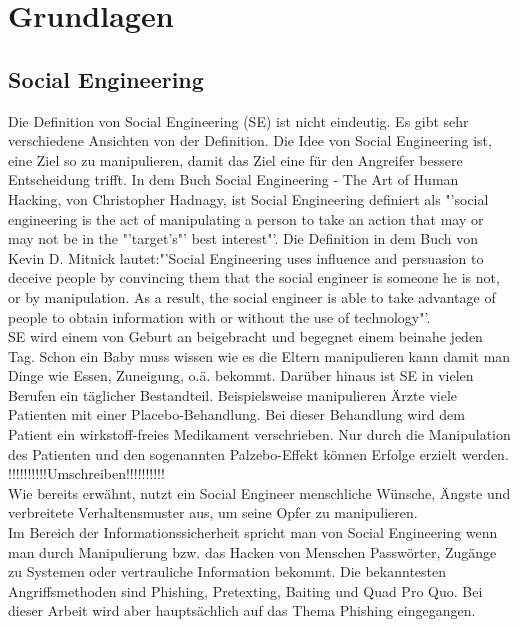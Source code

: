 
\chapter {Grundlagen}  %
\label{cha:grundlagen} %

\section{Social Engineering} %
\label {sec:Unterkapitel} %

Die Definition von Social Engineering (SE) ist nicht eindeutig. Es gibt sehr verschiedene Ansichten von der Definition. Die Idee von Social Engineering ist, eine Ziel so zu manipulieren, damit das Ziel eine für den Angreifer bessere Entscheidung trifft. In dem Buch Social Engineering - The Art of Human Hacking, von Christopher Hadnagy, ist Social Engineering definiert als "'social engineering is the act of manipulating a person to take an action that may or may not be in the "'target’s"' best interest"'\cite{ArtOfHumanHacking}. Die Definition in dem Buch von Kevin D. Mitnick lautet:"'Social Engineering uses influence and persuasion to deceive people by convincing them that the social engineer is someone he is not, or by manipulation. As a result, the social engineer is able to take advantage of people to obtain information with or without the use of technology"'\cite{ArtOfDeception}.\\

SE wird einem von Geburt an beigebracht und begegnet einem beinahe jeden Tag. Schon ein Baby muss wissen wie es die Eltern manipulieren kann damit man Dinge wie Essen, Zuneigung, o.ä. bekommt. Darüber hinaus ist SE in vielen Berufen ein täglicher Bestandteil. Beispielsweise manipulieren Ärzte viele Patienten mit einer Placebo-Behandlung. Bei dieser Behandlung wird dem Patient ein wirkstoff-freies Medikament verschrieben. Nur durch die Manipulation des Patienten und den sogenannten Palzebo-Effekt können Erfolge erzielt werden.\\

!!!!!!!!!!Umschreiben!!!!!!!!!!\\Wie bereits erwähnt, nutzt ein Social Engineer menschliche Wünsche, Ängste
und verbreitete Verhaltensmuster aus, um seine Opfer zu manipulieren.\cite{LeitfadenSE}\\

Im Bereich der Informationssicherheit spricht man von Social Engineering wenn man durch Manipulierung bzw. das Hacken von Menschen Passwörter, Zugänge zu Systemen oder vertrauliche Information bekommt. Die bekanntesten Angriffsmethoden sind Phishing, Pretexting, Baiting und Quad Pro Quo. Bei dieser Arbeit wird aber hauptsächlich auf das Thema Phishing eingegangen.

